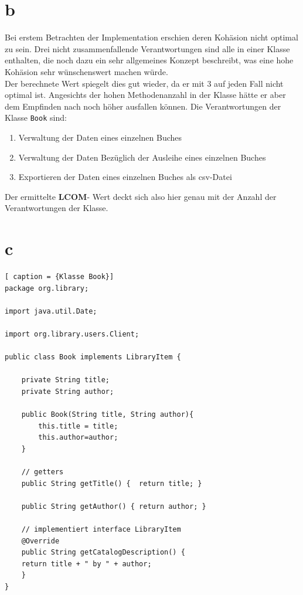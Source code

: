 \section*{b}
Bei erstem Betrachten der Implementation erschien deren Kohäsion nicht optimal zu sein. Drei nicht zusammenfallende Verantwortungen sind alle in einer Klasse enthalten, die noch dazu ein sehr allgemeines Konzept beschreibt, was eine hohe Kohäsion sehr wünschenswert machen würde.\\
Der berechnete Wert spiegelt dies gut wieder, da er mit 3 auf jeden Fall nicht optimal ist. Angesichts der hohen Methodenanzahl in der Klasse hätte er aber dem Empfinden nach noch höher ausfallen können.
Die Verantwortungen der Klasse \texttt{Book} sind:
\begin{enumerate}
	\item Verwaltung der Daten eines einzelnen Buches
	\item Verwaltung der Daten Bezüglich der Ausleihe eines einzelnen Buches
	\item Exportieren der Daten eines einzelnen Buches als csv-Datei
\end{enumerate}
 Der ermittelte \textbf{LCOM}- Wert deckt sich also hier genau mit der Anzahl der Verantwortungen der Klasse.
 
 
\section*{c}
\lstset{language=Java,
	showspaces=false,
	showtabs=false,
	breaklines=true,
	showstringspaces=false,
	breakatwhitespace=true,
}



\begin{lstlisting}[	caption = {Klasse Book}]
package org.library;

import java.util.Date;

import org.library.users.Client;

public class Book implements LibraryItem {
	
	private String title;
	private String author;
	
	public Book(String title, String author){
		this.title = title;
		this.author=author;
	}

	// getters
	public String getTitle() {  return title; }
	
	public String getAuthor() { return author; }

	// implementiert interface LibraryItem
	@Override
	public String getCatalogDescription() {
	return title + " by " + author;  
	}
}
\end{lstlisting}


